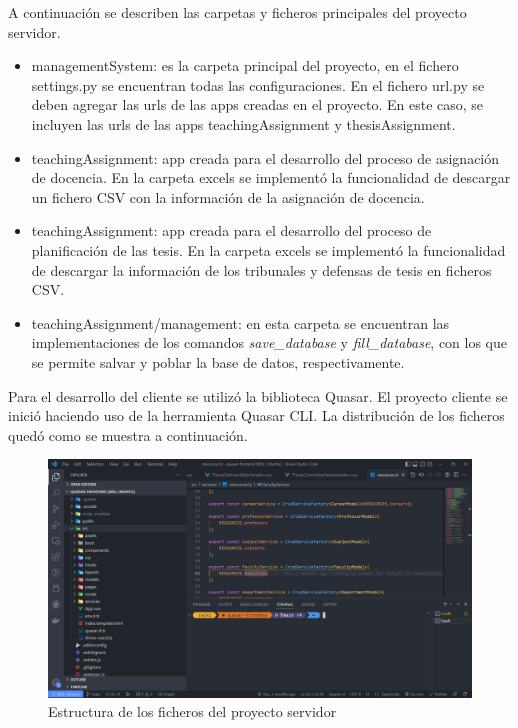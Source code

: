 A continuación se describen las carpetas y ficheros principales del proyecto 
servidor.

\begin{itemize}
    \item managementSystem: es la carpeta principal del proyecto, en el fichero settings.py se encuentran
    todas las configuraciones. En el fichero url.py se deben agregar las urls de las apps creadas 
    en el proyecto. En este caso, se incluyen las urls de las apps teachingAssignment y thesisAssignment. 
    \item teachingAssignment:  app creada para el desarrollo del proceso de asignación de docencia. En la carpeta excels 
    se implementó la funcionalidad de descargar un fichero CSV con la información de la asignación de docencia. 
    \item teachingAssignment:  app creada para el desarrollo del proceso de planificación de las tesis. En la carpeta excels 
    se implementó la funcionalidad de descargar la información de los tribunales y defensas de tesis en ficheros CSV.
    \item teachingAssignment/management: en esta carpeta se encuentran las implementaciones de los comandos \textit{save\_database} 
    y \textit{fill\_database}, con los que se permite salvar y poblar la base de datos, respectivamente.
\end{itemize}


Para el desarrollo del cliente se utilizó la biblioteca Quasar. El proyecto 
cliente se inició haciendo uso de la herramienta Quasar CLI. 
La distribución de los ficheros quedó como se muestra a continuación.

\begin{figure}[H]
    \includegraphics[scale=0.3]{Graphics/Extensibility/client-src-structure.png}
    \caption{Estructura de los ficheros del proyecto servidor}
    \label{img-client-structure}
\end{figure}


